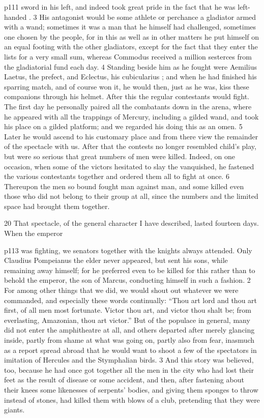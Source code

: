 p111 sword in his left, and indeed took great pride in the fact that he was left-handed . 3 His antagonist would be some athlete or perchance a gladiator armed with a wand; sometimes it was a man that he himself had challenged, sometimes one chosen by the people, for in this as well as in other matters he put himself on an equal footing with the other gladiators, except for the fact that they enter the lists for a very small sum, whereas Commodus received a million sesterces from the gladiatorial fund each day. 4 Standing beside him as he fought were Aemilius Laetus, the prefect, and Eclectus, his cubicularius ; and when he had finished his sparring match, and of course won it, he would then, just as he was, kiss these companions through his helmet. After this the regular contestants would fight. The first day he personally paired all the combatants down in the arena, where he appeared with all the trappings of Mercury, including a gilded wand, and took his place on a gilded platform; and we regarded his doing this as an omen. 5 Later he would ascend to his customary place and from there view the remainder of the spectacle with us. After that the contests no longer resembled child's play, but were so serious that great numbers of men were killed. Indeed, on one occasion, when some of the victors hesitated to slay the vanquished, he fastened the various contestants together and ordered them all to fight at once. 6 Thereupon the men so bound fought man against man, and some killed even those who did not belong to their group at all, since the numbers and the limited space had brought them together.

20
That spectacle, of the general character I have described, lasted fourteen days. When the emperor

p113 was fighting, we senators together with the knights always attended. Only Claudius Pompeianus the elder never appeared, but sent his sons, while remaining away himself; for he preferred even to be killed for this rather than to behold the emperor, the son of Marcus, conducting himself in such a fashion. 2 For among other things that we did, we would shout out whatever we were commanded, and especially these words continually: ``Thou art lord and thou art first, of all men most fortunate. Victor thou art, and victor thou shalt be; from everlasting, Amazonian, thou art victor.'' But of the populace in general, many did not enter the amphitheatre at all, and others departed after merely glancing inside, partly from shame at what was going on, partly also from fear, inasmuch as a report spread abroad that he would want to shoot a few of the spectators in imitation of Hercules and the Stymphalian birds. 3 And this story was believed, too, because he had once got together all the men in the city who had lost their feet as the result of disease or some accident, and then, after fastening about their knees some likenesses of serpents' bodies, and giving them sponges to throw instead of stones, had killed them with blows of a club, pretending that they were giants.

